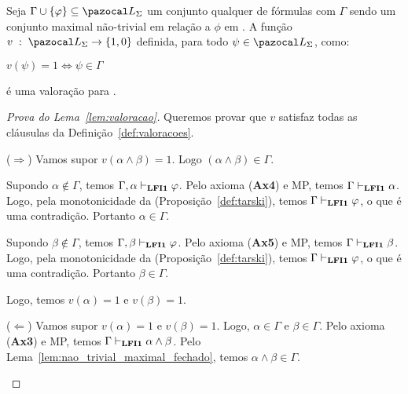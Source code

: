     \begin{lema}\label{lem:valoracao}
        Seja $\Gamma \cup \{\phi\} \subseteq \ling{}$ um conjunto qualquer de fórmulas com $\Gamma$ sendo um conjunto maximal não-trivial em relação a $\phi$ em \lfium{}. A função $v \; : \; \ling \to \{1, 0\}$ definida, para todo $\psi \in \ling$, como:
        \begin{center}
                $v(\psi) = 1 \Longleftrightarrow \psi \in \Gamma$
        \end{center}

        é uma valoração para \lfium{}.
    \end{lema}

    \begin{proof}[Prova do Lema~\ref{lem:valoracao}]
        Queremos provar que $v$ satisfaz todas as cláusulas da Definição~\ref{def:valoracoes}.

        \begin{provaporcasos}
            

                \begin{adjustwidth}{1cm}{}
                    \noindent ($\Longrightarrow$) Vamos supor $v(\alpha \land \beta) = 1$. Logo $(\alpha \land \beta) \in \Gamma$. 
                    
                    \noindent Supondo $\alpha \not \in \Gamma$, temos $\Gamma, \alpha \vdash_{{\normalfont\textbf{LFI1}}{}} \varphi$. Pelo axioma (\textbf{Ax4}) e MP, temos $\Gamma \vdash_{{\normalfont\textbf{LFI1}}{}} \alpha$. Logo, pela monotonicidade da \lfium{} (Proposição~\ref{def:tarski}), temos $\Gamma \vdash_{{\normalfont\textbf{LFI1}}{}} \varphi$, o que é uma contradição. Portanto $\alpha \in \Gamma$.
        
                    \noindent Supondo $\beta \not \in \Gamma$, temos $\Gamma, \beta \vdash_{{\normalfont\textbf{LFI1}}{}} \varphi$. Pelo axioma (\textbf{Ax5}) e MP, temos $\Gamma \vdash_{{\normalfont\textbf{LFI1}}{}} \beta$. Logo, pela monotonicidade da \lfium{} (Proposição~\ref{def:tarski}), temos $\Gamma \vdash_{{\normalfont\textbf{LFI1}}{}} \varphi$, o que é uma contradição. Portanto $\beta \in \Gamma$.
        
                    \noindent Logo, temos $v(\alpha) = 1$ e $v(\beta) = 1$.

                \end{adjustwidth}

                \begin{adjustwidth}{1cm}{}
                    \noindent ($\Longleftarrow$) Vamos supor $v(\alpha) = 1$ e $v(\beta) = 1$. Logo, $\alpha \in \Gamma$ e $\beta \in \Gamma$. Pelo axioma (\textbf{Ax3}) e MP, temos $\Gamma \vdash_{{\normalfont\textbf{LFI1}}{}} \alpha \land \beta$. Pelo Lema~\ref{lem:nao_trivial_maximal_fechado}, temos $\alpha \land \beta \in \Gamma$.


\end{adjustwidth}
\end{provaporcasos}
\end{proof}
